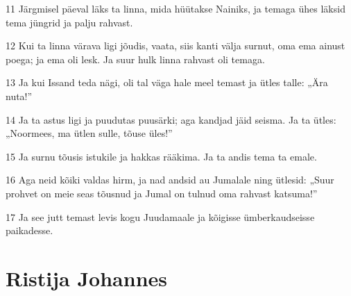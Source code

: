 \par 11 Järgmisel päeval läks ta linna, mida hüütakse Nainiks, ja temaga ühes läksid tema jüngrid ja palju rahvast.
\par 12 Kui ta linna värava ligi jõudis, vaata, siis kanti välja surnut, oma ema ainust poega; ja ema oli lesk. Ja suur hulk linna rahvast oli temaga.
\par 13 Ja kui Issand teda nägi, oli tal väga hale meel temast ja ütles talle: „Ära nuta!”
\par 14 Ja ta astus ligi ja puudutas puusärki; aga kandjad jäid seisma. Ja ta ütles: „Noormees, ma ütlen sulle, tõuse üles!”
\par 15 Ja surnu tõusis istukile ja hakkas rääkima. Ja ta andis tema ta emale.
\par 16 Aga neid kõiki valdas hirm, ja nad andsid au Jumalale ning ütlesid: „Suur prohvet on meie seas tõusnud ja Jumal on tulnud oma rahvast katsuma!”
\par 17 Ja see jutt temast levis kogu Juudamaale ja kõigisse ümberkaudseisse paikadesse.

\section*{Ristija Johannes}

